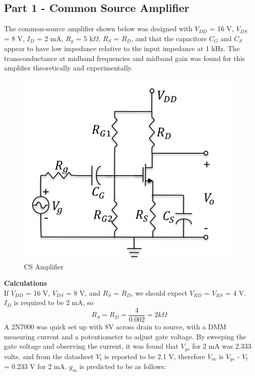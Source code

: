 \documentclass[12pt]{article}
\begin{document}
\subsection*{Part 1 - Common Source Amplifier}
The common-source amplifier shown below was designed with $V_{DD}$ = 16 V, $V_{DS}$ = 8 V, $I_D$ = 2 mA, $R_g$ = 5 k$\Omega$, $R_S$ = $R_D$, and that the capacitors $C_G$ and $C_S$ appear to have low impedance relative to the input impedance at 1 kHz. The transconductance at midband frequencies and midband gain was found for this amplifier theoretically and experimentally.
\FloatBarrier
\begin{figure}[h!]
\begin{center}
 \includegraphics[scale=0.23]{./plots/1.png}
\end{center}
\caption{CS Amplifier}
\end{figure}
\FloatBarrier
\textbf{Calculations}\\
If $V_{DD}$ = 16 V, $V_{DS}$ = 8 V, and $R_S$ = $R_D$, we should expect $V_{RD}$ = $V_{RS}$ = 4 V. $I_D$ is required to be 2 mA, so  
\begin{equation}
R_S = R_D = \frac{4}{0.002} = 2 k\Omega
\end{equation}
A 2N7000 was quick set up with 8V across drain to source, with a DMM measuring current and a potentiometer to adjust gate voltage. By sweeping the gate voltage and observing the current, it was found that $V_{gs}$ for 2 mA was 2.333 volts, and from the datasheet $V_t$ is reported to be 2.1 V, therefore $V_{ov}$ is $V_{gs}$ - $V_t$ = 0.233 V for 2 mA. $g_m$ is predicted to be as follows:
\end{document}
